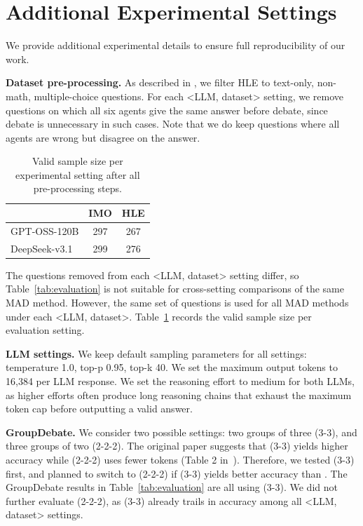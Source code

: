 \section{\label{sec:additional-exp-setting}Additional Experimental Settings}

We provide additional experimental details to ensure full reproducibility of our work.

\noindent\textbf{Dataset pre-processing.} As described in , we filter HLE to text-only, non-math, multiple-choice questions. For each <LLM, dataset> setting, we remove questions on which all six agents give the same answer before debate, since debate is unnecessary in such cases. Note that we do keep questions where all agents are wrong but disagree on the answer.

\begin{table}[h]
\centering
\begin{tabular}{lcc}
\toprule
 & IMO & HLE \\
\midrule
GPT-OSS-120B & 297 & 267 \\
DeepSeek-v3.1             & 299 & 276 \\
\bottomrule
\end{tabular}
\caption{\label{tab:dataset-size}Valid sample size per experimental setting after all pre-processing steps.}
\end{table}

The questions removed from each <LLM, dataset> setting differ, so Table~\ref{tab:evaluation} is not suitable for cross-setting comparisons of the same MAD method. However, the same set of questions is used for all MAD methods under each <LLM, dataset>. Table~\ref{tab:dataset-size} records the valid sample size per evaluation setting.

\noindent\textbf{LLM settings.} We keep default sampling parameters for all settings: temperature 1.0, top-p 0.95, top-k 40. We set the maximum output tokens to 16,384 per LLM response. We set the reasoning effort to medium for both LLMs, as higher efforts often produce long reasoning chains that exhaust the maximum token cap before outputting a valid answer.

\noindent\textbf{GroupDebate.} We consider two possible settings: two groups of three (3-3), and three groups of two (2-2-2). The original paper suggests that (3-3) yields higher accuracy while (2-2-2) uses fewer tokens (Table 2 in~\citep{Liu2025Groupdebate}). Therefore, we tested (3-3) first, and planned to switch to (2-2-2) if (3-3) yields better accuracy than \sysname. The GroupDebate results in Table~\ref{tab:evaluation} are all using (3-3). We did not further evaluate (2-2-2), as (3-3) already trails \sysname in accuracy among all <LLM, dataset> settings.


